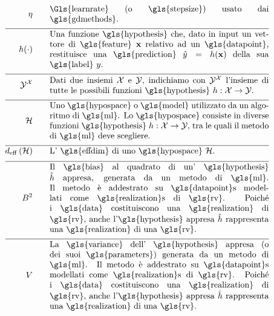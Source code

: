 \begin{align}
\lrate  \quad\quad & \parbox{.75\textwidth}{\Gls{learnrate} (o \gls{stepsize}) usato dai \gls{gdmethods}.}  \nonumber \\[2mm] \hline \nonumber\\[-5mm]
	\hypothesis(\cdot)  \quad\quad &\parbox{.75\textwidth}{Una funzione \gls{hypothesis} che, dato in input un vettore di \gls{feature} $\featurevec$ relativo ad un \gls{datapoint}, restituisce una \gls{prediction} $\hat{\truelabel}=\hypothesis(\featurevec)$ della sua \gls{label} $\truelabel$.}  	 \nonumber \\[2mm] \hline \nonumber\\[-5mm]
	 \labelspace^{\featurespace} \quad\quad & \parbox{.75\textwidth}{Dati due insiemi $\featurespace$ e $\labelspace$, indichiamo con $ \labelspace^{\featurespace}$ l'insieme di tutte le possibili funzioni \gls{hypothesis} $\hypothesis: \featurespace \rightarrow \labelspace$.} 	 \nonumber \\[2mm] \hline \nonumber\\[-5mm]
	\hypospace  \quad\quad & \parbox{.75\textwidth}{Uno \gls{hypospace} o \gls{model} utilizzato da un algoritmo di \gls{ml}. 
		Lo \gls{hypospace} consiste in diverse funzioni \gls{hypothesis} $\hypothesis: \featurespace \rightarrow \labelspace$, tra le quali il metodo di \gls{ml} deve scegliere.}   \nonumber \\[2mm] \hline \nonumber\\[-5mm]
	\effdim{\hypospace}  \quad\quad & \parbox{.75\textwidth}{L' \gls{effdim} di uno \gls{hypospace} $\hypospace$.}   \nonumber \\[2mm] \hline \nonumber\\[-5mm]
	\biasterm^2 \quad\quad &\parbox{.75\textwidth}{
		Il \gls{bias} al quadrato di un' \gls{hypothesis} $\learnthypothesis$ 
		appresa, generata da un metodo di \gls{ml}. Il metodo è addestrato su \gls{datapoint}s 
		modellati come \gls{realization}s di \gls{rv}. Poiché i \gls{data} costituiscono una \gls{realization} 
		di \gls{rv}, anche l'\gls{hypothesis} appresa $\learnthypothesis$ rappresenta una \gls{realization} 
		di una \gls{rv}.} \nonumber  \nonumber \\[2mm] \hline \nonumber\\[-5mm]
	\varianceterm \quad\quad &\parbox{.75\textwidth}{La \gls{variance} dell' 
		\gls{hypothesis} appresa (o dei suoi \gls{parameters}) generata da un metodo di \gls{ml}. 
		Il metodo è addestrato su \gls{datapoint}s 
		modellati come \gls{realization}s di \gls{rv}. Poiché i \gls{data} costituiscono una \gls{realization} 
		di \gls{rv}, anche l'\gls{hypothesis} appresa $\learnthypothesis$ rappresenta una \gls{realization} 
		di una \gls{rv}.} \nonumber \nonumber %
\end{align}     


